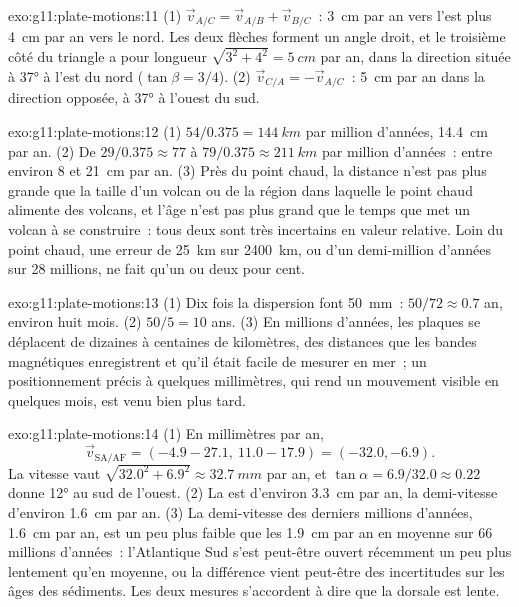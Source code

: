 \begin{solution}{exo:g11:plate-motions:11}
(1) $\vec v_{A/C} = \vec v_{A/B} + \vec v_{B/C}$~: \qty{3}{cm} par an vers
l'est plus \qty{4}{cm} par an vers le nord. Les deux flèches forment un
angle droit, et le troisième côté du triangle a pour longueur
$\sqrt{3^2 + 4^2} = \qty{5}{cm}$ par an,
dans la direction située à \ang{37} à l'est du nord ($\tan\beta = 3/4$).
(2) $\vec v_{C/A}
= -\vec v_{A/C}$~: \qty{5}{cm} par an dans la direction opposée, à \ang{37}
à l'ouest du sud.
\end{solution}

\begin{solution}{exo:g11:plate-motions:12}
(1) $54/0.375 = \qty{144}{km}$ par million d'années, \qty{14.4}{cm} par an.
(2) De $29/0.375 \approx 77$ à $79/0.375 \approx \qty{211}{km}$ par million
d'années~: entre environ 8 et \qty{21}{cm} par an. (3) Près du point chaud,
la distance n'est pas plus grande que la taille d'un volcan ou de la région
dans laquelle le point chaud alimente des volcans, et l'âge n'est pas plus
grand que le temps que met un volcan à se construire~: tous deux sont très
incertains en valeur relative. Loin du point chaud, une erreur de
\qty{25}{km} sur \qty{2400}{km}, ou d'un demi-million d'années sur
28 millions, ne fait qu'un ou deux pour cent.
\end{solution}

\begin{solution}{exo:g11:plate-motions:13}
(1) Dix fois la dispersion font \qty{50}{mm}~: $50/72 \approx 0.7$ an,
environ huit mois. (2) $50/5 = 10$ ans. (3) En millions d'années, les
plaques se déplacent de dizaines à centaines de kilomètres, des distances
que les bandes magnétiques enregistrent et qu'il était facile de mesurer en
mer~; un positionnement précis à quelques millimètres, qui rend un mouvement
visible en quelques mois, est venu bien plus tard.
\end{solution}

\begin{solution}{exo:g11:plate-motions:14}
(1) En millimètres par an,
\[
  \vec v_{\mathrm{SA/AF}} = (-4.9 - 27.1,\ 11.0 - 17.9) = (-32.0, -6.9).
\] La vitesse vaut $\sqrt{32.0^2 + 6.9^2} \approx
\qty{32.7}{mm}$ par an, et $\tan\alpha = 6.9/32.0 \approx 0.22$ donne
\ang{12} au sud de l'ouest. (2) La  est d'environ
\qty{3.3}{cm} par an, la demi-vitesse d'environ \qty{1.6}{cm} par an. (3) La
demi-vitesse des derniers millions d'années, \qty{1.6}{cm} par an, est un
peu plus faible que les \qty{1.9}{cm} par an en moyenne sur 66 millions
d'années~: l'Atlantique Sud s'est peut-être ouvert récemment un peu plus
lentement qu'en moyenne, ou la différence vient peut-être des incertitudes
sur les âges des sédiments. Les deux mesures s'accordent à dire que la
dorsale est lente.
\end{solution}

